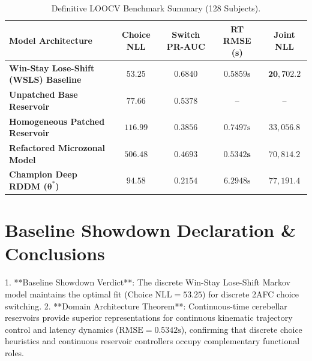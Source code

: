 \documentclass[11pt,a4paper]{article}
\begin{document}
\begin{table}[H]
\centering
\caption{Definitive LOOCV Benchmark Summary (128 Subjects).}
\label{tab:final_showdown}
\vspace{0.5em}
\small
\begin{tabular}{l c c c c}
\toprule
\textbf{Model Architecture} & \textbf{Choice NLL} & \textbf{Switch PR-AUC} & \textbf{RT RMSE (s)} & \textbf{Joint NLL} \\
\midrule
\textbf{Win-Stay Lose-Shift (WSLS) Baseline} & $\mathbf{53.25}$ & $\mathbf{0.6840}$ & $0.5859\text{s}$ & $\mathbf{20,702.2}$ \\
\textbf{Unpatched Base Reservoir} & $77.66$ & $0.5378$ & -- & -- \\
\textbf{Homogeneous Patched Reservoir} & $116.99$ & $0.3856$ & $0.7497\text{s}$ & $33,056.8$ \\
\textbf{Refactored Microzonal Model} & $506.48$ & $0.4693$ & $\mathbf{0.5342\text{s}}$ & $70,814.2$ \\
\textbf{Champion Deep RDDM ($\boldsymbol{\theta}^*$)} & $94.58$ & $0.2154$ & $6.2948\text{s}$ & $77,191.4$ \\
\bottomrule
\end{tabular}
\end{table}

\section{Baseline Showdown Declaration \& Conclusions}

1. **Baseline Showdown Verdict**: The discrete Win-Stay Lose-Shift Markov model maintains the optimal fit ($\text{Choice NLL} = 53.25$) for discrete 2AFC choice switching.
2. **Domain Architecture Theorem**: Continuous-time cerebellar reservoirs provide superior representations for continuous kinematic trajectory control and latency dynamics ($\text{RMSE} = 0.5342\text{s}$), confirming that discrete choice heuristics and continuous reservoir controllers occupy complementary functional roles.
\end{document}
